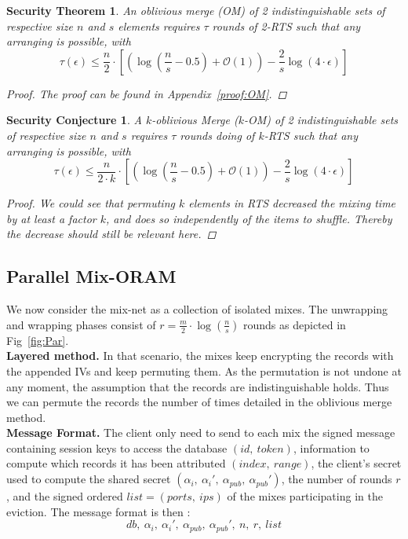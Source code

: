 \documentclass[USenglish,oneside,twocolumn]{article}
\newtheorem{secthm}{Security Theorem}
\newtheorem{seccjt}{Security Conjecture}
\begin{document}
\begin{secthm}
An oblivious merge (OM) of 2 indistinguishable sets of respective size $n$ and $s$ elements requires $\tau$ rounds of 2-RTS such that any arranging is possible, with
$$\tau(\epsilon) \leq \frac{n}{2}  \cdot \left [ \left( \log \left (\frac{n}{s}-0.5\right) +\mathcal{O}\left(1\right) \right ) - \frac{2}{s} \log \left( 4 \cdot \epsilon\right) \right ] $$%
\begin{proof}
The proof can be found in Appendix~\ref{proof:OM}.
\end{proof}
\end{secthm}

\begin{seccjt}\label{sec:kOM}
A $k$-oblivious Merge ($k$-OM) of 2 indistinguishable sets of respective size $n$ and $s$ requires $\tau$ rounds doing of $k$-RTS such that any arranging is possible, with
$$ \tau(\epsilon) \leq \frac{n}{2\cdot k}  \cdot \left [ \left( \log \left (\frac{n}{s}-0.5\right) +\mathcal{O}\left(1\right) \right ) - \frac{2}{s} \log \left( 4 \cdot \epsilon\right) \right ] $$
\begin{proof}
We could see that permuting $k$ elements in RTS decreased the mixing time by at least a factor $k$, and does so independently of the items to shuffle. Thereby the decrease should still be relevant here.
\end{proof}
\end{seccjt}
%
\subsection{Parallel Mix-ORAM}\label{parallelMixORAM}
%
We now consider the mix-net as a collection of isolated mixes. The unwrapping and wrapping phases consist of $r= \frac{m}{2} \cdot \log \left (\frac{n}{s} \right ) $ rounds as depicted in Fig~\ref{fig:Par}.\\


\noindent\textbf{Layered method.} In that scenario, the mixes keep encrypting the records with the appended IVs and keep permuting them. As the permutation is not undone at any moment, the assumption that the records are indistinguishable holds. Thus we can permute the records the number of times detailed in the oblivious merge method. \\

\noindent\textbf{Message Format.}
The client only need to send to each mix the signed message containing session keys to access the database $(id,\ token)$, information to compute which records it has been attributed $(index,\ range)$, the client's secret used to compute the shared secret $(\alpha_i,\ \alpha_i',\ \alpha_{pub},\ \alpha_{pub}')$, the number of rounds $r$, and the signed ordered $list=(ports,\ ips)$ of the mixes participating in the eviction.
The message format is then : $$db,\ \alpha_i,\ \alpha_i',\ \alpha_{pub},\ \alpha_{pub}',\ n,\ r,\ list$$
\end{document}
